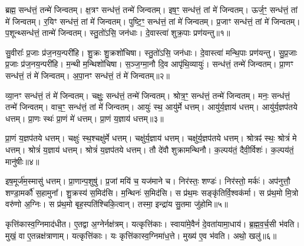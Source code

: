 \setcounter{anuvakam}{0}

ब्रह्म॒ सन्ध॑त्तं॒ तन्मे॑ जिन्वतम्।
क्ष॒त्रꣳ सन्ध॑त्तं॒ तन्मे॑ जिन्वतम्।
इष॒ꣳ॒ सन्ध॑त्तं॒ तां मे॑ जिन्वतम्।
ऊर्ज॒ꣳ॒ सन्ध॑त्तं॒ तां मे॑ जिन्वतम्।
र॒यिꣳ सन्ध॑त्तं॒ तां मे॑ जिन्वतम्।
पुष्टि॒ꣳ॒ सन्ध॑त्तं॒ तां मे॑ जिन्वतम्।
प्र॒जाꣳ सन्ध॑त्तं॒ तां मे॑ जिन्वतम्।
प॒शून्थ्सन्ध॑त्तं॒ तान्मे॑ जिन्वतम्।
स्तु॒तो॑ऽसि॒ जन॑धाः।
दे॒वास्त्वा॑ शुक्र॒पाः प्रण॑यन्तु॥१॥\ip

सु॒वीराः᳚ प्र॒जाः प्र॑ज॒नय॒न्परी॑हि।
शु॒क्रः शु॒क्रशो॑चिषा।
स्तु॒तो॑ऽसि॒ जन॑धाः।
दे॒वास्त्वा॑ मन्थि॒पाः प्रण॑यन्तु।
सु॒प्र॒जाः प्र॒जाः प्र॑ज॒नय॒न्परी॑हि।
म॒न्थी म॒न्थिशो॑चिषा।
स॒ञ्ज॒ग्मा॒नौ दि॒व आपृ॑थि॒व्यायुः॑।
सन्ध॑त्तं॒ तन्मे॑ जिन्वतम्।
प्रा॒णꣳ सन्ध॑त्तं॒ तं मे॑ जिन्वतम्।
अ॒पा॒नꣳ सन्ध॑त्तं॒ तं मे॑ जिन्वतम्॥२॥\ip

व्या॒नꣳ सन्ध॑त्तं॒ तं मे॑ जिन्वतम्।
चक्षुः॒ सन्ध॑त्तं॒ तन्मे॑ जिन्वतम्।
श्रोत्र॒ꣳ॒ सन्ध॑त्तं॒ तन्मे॑ जिन्वतम्।
मनः॒ सन्ध॑त्तं॒ तन्मे॑ जिन्वतम्।
वाच॒ꣳ॒ सन्ध॑त्तं॒ तां मे॑ जिन्वतम्।
आयुः॑ स्थ॒ आयु॑र्मे धत्तम्।
आयु॑र्य॒ज्ञाय॑ धत्तम्।
आयु॑र्य॒ज्ञप॑तये धत्तम्।
प्रा॒णः स्थः॑ प्रा॒णं मे॑ धत्तम्।
प्रा॒णं य॒ज्ञाय॑ धत्तम्॥३॥\ip

प्रा॒णं य॒ज्ञप॑तये धत्तम्।
चक्षुः॑ स्थ॒श्चक्षु॑र्मे धत्तम्।
चक्षु॑र्य॒ज्ञाय॑ धत्तम्।
चक्षु॑र्य॒ज्ञप॑तये धत्तम्।
श्रोत्रꣴ॑ स्थः॒ श्रोत्रं॑ मे धत्तम्।
श्रोत्रं॑ य॒ज्ञाय॑ धत्तम्।
श्रोत्रं॑ य॒ज्ञप॑तये धत्तम्।
तौ दे॑वौ शुक्रामन्थिनौ।
क॒ल्पय॑तं॒ दैवी॒र्विशः॑।
क॒ल्पय॑तं॒ मानु॑षीः॥४॥\ip

इष॒मूर्ज॑म॒स्मासु॑ धत्तम्।
प्रा॒णान्प॒शुषु॑।
प्र॒जां मयि॑ च॒ यज॑माने च।
निर॑स्तः॒ शण्डः॑।
निर॑स्तो॒ मर्कः॑।
अप॑नुत्तौ॒ शण्डा॒मर्कौ॑ स॒हामुना᳚।
शु॒क्रस्य॑ स॒मिद॑सि।
म॒न्थिनः॑ स॒मिद॑सि।
स प्र॑थ॒मः सङ्कृ॑तिर्वि॒श्वक॑र्मा।
स प्र॑थ॒मो मि॒त्रो वरु॑णो अ॒ग्निः।
स प्र॑थ॒मो बृह॒स्पति॑श्चिकि॒त्वान्।
तस्मा॒ इन्द्रा॑य सु॒तमा जु॑होमि॥५॥\ip\anuvakamend[न॒य॒न्त्व॒पा॒नꣳ सन्ध॑त्तं॒ तं मे॑ जिन्वतं प्रा॒णं य॒ज्ञाय॑ धत्तं॒ मानु॑षीर॒ग्निर्द्वे च॑॥ (ब्रह्म॑ क्ष॒त्रं तदिष॒मूर्जꣳ॑ र॒यिं पुष्टिं॑ प्र॒जां तां प॒शून्तान्थ्सन्ध॑त्तं॒ तत्प्रा॒णम॑पा॒नं व्या॒नं तं चक्षुः॒ श्रोत्रं॒ मन॒स्तद्वाचं॒ ताम्।
इ॒षादि॒पञ्च॑के॒ वाचं॒ तां मे॑ प॒शून्थ्सन्ध॑त्तं॒ तान्मे᳚ प्रा॒णादि॒त्रित॑ये॒ तं मे॒\-ऽन्यत्र॒ तन्मे᳚)]

कृत्ति॑कास्व॒ग्निमाद॑धीत।
ए॒तद्वा अ॒ग्नेर्नक्ष॑त्रम्।
यत्कृत्ति॑काः।
स्वाया॑मे॒वैनं॑ दे॒वता॑यामा॒धाय॑।
ब्र॒ह्म॒व॒र्च॒सी भ॑वति।
मुखं॒ वा ए॒तन्नक्ष॑त्राणाम्।
यत्कृत्ति॑काः।
यः कृत्ति॑कास्व॒ग्निमा॑ध॒त्ते।
मुख्य॑ ए॒व भ॑वति।
अथो॒ खलु॑॥६॥\ip

